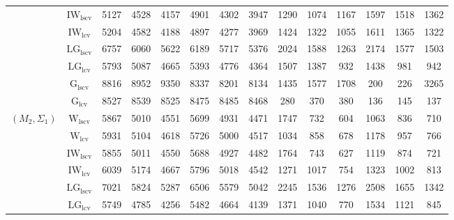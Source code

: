 \begin{table}[!ht]
{\begin{tabular}{@{}cc|ccc|ccc|ccc|ccc@{}}
 & $\mathrm{IW}_{\mathrm{lscv}}$ & \cellcolor{black!30}5127 & \cellcolor{black!30}4528 & \cellcolor{black!30}4157 & \cellcolor{black!10}4901 & \cellcolor{black!10}4302 & \cellcolor{black!30}3947 & \cellcolor{black!10}1290 & \cellcolor{black!10}1074 & 1167 & 1597 & 1518 & 1362 \\ 
 & $\mathrm{IW}_{\mathrm{lcv}}$ & 5204 & \cellcolor{black!10}4582 & \cellcolor{black!10}4188 & \cellcolor{black!30}4897 & \cellcolor{black!30}4277 & \cellcolor{black!10}3969 & 1424 & 1322 & 1055 & 1611 & 1365 & 1322 \\ 
 & $\mathrm{LG}_{\mathrm{lscv}}$ & 6757 & 6060 & 5622 & 6189 & 5717 & 5376 & 2024 & 1588 & 1263 & 2174 & 1577 & 1503 \\ 
 & $\mathrm{LG}_{\mathrm{lcv}}$ & 5793 & 5087 & 4665 & 5393 & 4776 & 4364 & 1507 & 1387 & \cellcolor{black!10}932 & 1438 & 981 & \cellcolor{black!10}942 \\ 
 & $\mathrm{G}_{\mathrm{lscv}}$ & 8816 & 8952 & 9350 & 8337 & 8201 & 8134 & 1435 & 1577 & 1708 & \cellcolor{black!10}200 & \cellcolor{black!10}226 & 3265 \\ 
 & $\mathrm{G}_{\mathrm{lcv}}$ & 8527 & 8539 & 8525 & 8475 & 8485 & 8468 & \cellcolor{black!30}280 & \cellcolor{black!30}370 & \cellcolor{black!30}380 & \cellcolor{black!30}136 & \cellcolor{black!30}145 & \cellcolor{black!30}137 \\ 
\midrule
$(M_2,\Sigma_1)$ & $\mathrm{W}_{\mathrm{lscv}}$ & 5867 & \cellcolor{black!10}5010 & 4551 & 5699 & 4931 & \cellcolor{black!10}4471 & 1747 & 732 & \cellcolor{black!10}604 & 1063 & 836 & \cellcolor{black!10}710 \\ 
 & $\mathrm{W}_{\mathrm{lcv}}$ & 5931 & 5104 & 4618 & 5726 & 5000 & 4517 & 1034 & 858 & 678 & 1178 & 957 & 766 \\ 
 & $\mathrm{IW}_{\mathrm{lscv}}$ & \cellcolor{black!10}5855 & 5011 & \cellcolor{black!10}4550 & \cellcolor{black!10}5688 & \cellcolor{black!10}4927 & 4482 & 1764 & 743 & 627 & 1119 & 874 & 721 \\ 
 & $\mathrm{IW}_{\mathrm{lcv}}$ & 6039 & 5174 & 4667 & 5796 & 5018 & 4542 & 1271 & 1017 & 754 & 1323 & 1002 & 813 \\ 
 & $\mathrm{LG}_{\mathrm{lscv}}$ & 7021 & 5824 & 5287 & 6506 & 5579 & 5042 & 2245 & 1536 & 1276 & 2508 & 1655 & 1342 \\ 
 & $\mathrm{LG}_{\mathrm{lcv}}$ & \cellcolor{black!30}5749 & \cellcolor{black!30}4785 & \cellcolor{black!30}4256 & \cellcolor{black!30}5482 & \cellcolor{black!30}4664 & \cellcolor{black!30}4139 & 1371 & 1040 & 770 & 1534 & 1121 & 845 \\ 

\end{tabular}}
\end{table}
